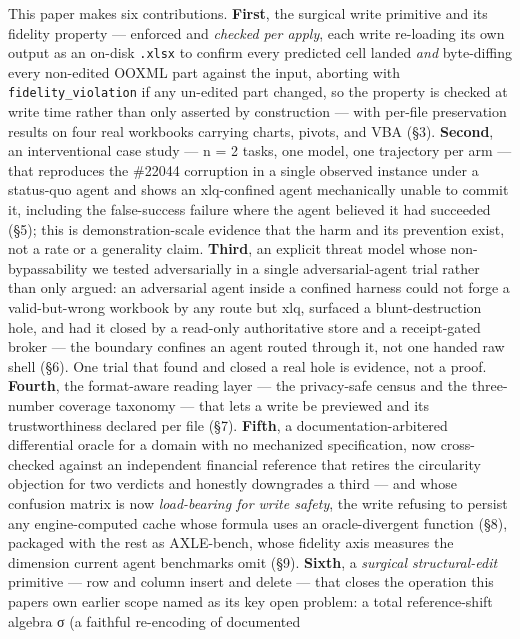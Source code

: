 \documentclass[
]{article}
\begin{document}
This paper makes six contributions. \textbf{First}, the surgical write
primitive and its fidelity property --- enforced and \emph{checked per
apply}, each write re-loading its own output as an on-disk
\texttt{.xlsx} to confirm every predicted cell landed \emph{and}
byte-diffing every non-edited OOXML part against the input, aborting
with \texttt{fidelity\_violation} if any un-edited part changed, so the
property is checked at write time rather than only asserted by
construction --- with per-file preservation results on four real
workbooks carrying charts, pivots, and VBA (§3). \textbf{Second}, an
interventional case study --- n = 2 tasks, one model, one trajectory per
arm --- that reproduces the \#22044 corruption in a single observed
instance under a status-quo agent and shows an xlq-confined agent
mechanically unable to commit it, including the false-success failure
where the agent believed it had succeeded (§5); this is
demonstration-scale evidence that the harm and its prevention exist, not
a rate or a generality claim. \textbf{Third}, an explicit threat model
whose non-bypassability we tested adversarially in a single
adversarial-agent trial rather than only argued: an adversarial agent
inside a confined harness could not forge a valid-but-wrong workbook by
any route but xlq, surfaced a blunt-destruction hole, and had it closed
by a read-only authoritative store and a receipt-gated broker --- the
boundary confines an agent routed through it, not one handed raw shell
(§6). One trial that found and closed a real hole is evidence, not a
proof. \textbf{Fourth}, the format-aware reading layer --- the
privacy-safe census and the three-number coverage taxonomy --- that lets
a write be previewed and its trustworthiness declared per file (§7).
\textbf{Fifth}, a documentation-arbitered differential oracle for a
domain with no mechanized specification, now cross-checked against an
independent financial reference that retires the circularity objection
for two verdicts and honestly downgrades a third --- and whose confusion
matrix is now \emph{load-bearing for write safety}, the write refusing
to persist any engine-computed cache whose formula uses an
oracle-divergent function (§8), packaged with the rest as AXLE-bench,
whose fidelity axis measures the dimension current agent benchmarks omit
(§9). \textbf{Sixth}, a \emph{surgical structural-edit} primitive ---
row and column insert and delete --- that closes the operation this
paper\textquotesingle s own earlier scope named as its key open problem:
a total reference-shift algebra σ (a faithful re-encoding of documented
\end{document}
